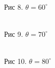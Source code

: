 \documentclass[12pt]{article}
\begin{document}
  \begin{figure}[h!]
    \begin{minipage}[h]{0.32\linewidth}
      \\
      Рис 8. $\theta = 60^{\circ}$
    \end{minipage}
    \begin{minipage}[h]{0.32\linewidth}
      \\
      Рис 9. $\theta = 70^{\circ}$
    \end{minipage}
    \begin{minipage}[h]{0.32\linewidth}
      \\
      Рис 10. $\theta = 80^{\circ}$
    \end{minipage}
  \end{figure}
\end{document}
